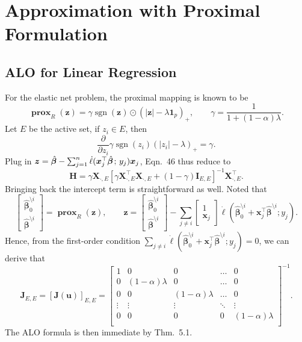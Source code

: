 \documentclass[11pt]{article}
\newcommand{\bx}{\bm{x}}
\newcommand{\bz}{\bm{z}}
\newcommand{\bH}{\bm{H}}
\newcommand{\bI}{\bm{I}}
\newcommand{\bX}{\bm{X}}
\newcommand{\bbeta}{\bm{\beta}}
\newcommand{\bOne}{\bm{1}}
\newcommand{\semicol}{\nobreak\mskip2mu\mathpunct{}\nonscript\mkern-\thinmuskip{;}\mskip6muplus1mu\relax}
\DeclareMathOperator{\sign}{sgn}
\DeclareMathOperator{\bprox}{\mathbf{prox}}
\newcommand{\refthm}[2]{#1~#2}
\begin{document}
\section{Approximation with Proximal Formulation}
\subsection{ALO for Linear Regression}
For the elastic net problem, the proximal mapping is known to be
	\begin{equation}
	\bprox_R\left(\bz\right)=\gamma\sign(\bz)\odot(|\bz|-\lambda\bOne_p)_+,\qquad\gamma=\frac{1}{1+(1-\alpha)\lambda}.
	\end{equation}
Let \(E\) be the active set, if \(z_i\in E\), then \[\frac{\partial}{\partial z_i}\gamma\sign(z_i)(|z_i|-\lambda)_+=\gamma.\] Plug in \(\bz=\hat{\bbeta}-\sum_{j=1}^{n}\dot{\ell}(\bx_j^\top\hat{\bbeta}\semicol y_j)\bx_j\), \refthm{Eqn.}{46} thus reduce to 
	\begin{equation}
	\bH=\gamma\bX_{\cdot,E}\left[\gamma\bX_{\cdot,E}^\top\bX_{\cdot,E}+\left(1-\gamma\right)\bI_{E,E}\right]^{-1}\bX_{\cdot,E}^\top.
	\end{equation}
Bringing back the intercept term is straightforward as well. Noted that \[\begin{bmatrix}
\hat{\bbeta}_0^{\setminus i} \\
\hat{\bm{\bbeta}}^{\setminus i}\end{bmatrix}=
\bprox_{R}\left(\bz\right),\qquad\bz=\begin{bmatrix}
\hat{\bbeta}_0^{\setminus i} \\
\hat{\bm{\bbeta}}^{\setminus i}\end{bmatrix}-
\sum_{j\neq i}\begin{bmatrix}
1 \\
\bm{x}_j\end{bmatrix}
\dot{\ell}\left(\hat{\bbeta}_0^{\setminus i}+\bm{x}_j^\top\hat{\bm{\bbeta}}^{\setminus i};y_j\right).\] Hence, from the first-order condition \(\sum_{j\neq i}\dot{\ell}\left(\hat{\bbeta}_0^{\setminus i}+\bm{x}_j^\top\hat{\bm{\bbeta}}^{\setminus i};y_j\right)=0\), we can derive that 
	\begin{equation}
	\bm{J}_{E,E}=
	\left[\bm{J}(\bm{u})\right]_{E,E}=
	\begin{bmatrix}
	1 & 0 & 0 & \dots & 0\\
	0 & (1-\alpha)\lambda & 0 & \dots & 0\\
	0 & 0 & (1-\alpha)\lambda & \dots & 0\\
	\vdots & \vdots & \vdots & \ddots & \vdots\\
	0 & 0 & 0 & 0 & (1-\alpha)\lambda\\
	\end{bmatrix}^{-1}.
	\end{equation}
The ALO formula is then immediate by \refthm{Thm.}{5.1}.
\end{document}
